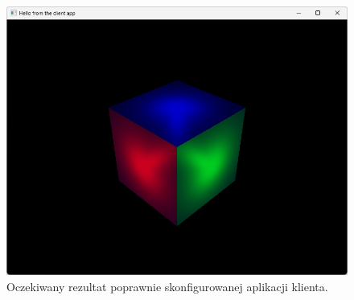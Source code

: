 \begin{figure}[h!]
	\centering
	\includegraphics[width=\textwidth]{images/appendix_engine_demo.png}
	\caption{Oczekiwany rezultat poprawnie skonfigurowanej aplikacji klienta.}
	\label{appendix_engine_demo}
\end{figure}


